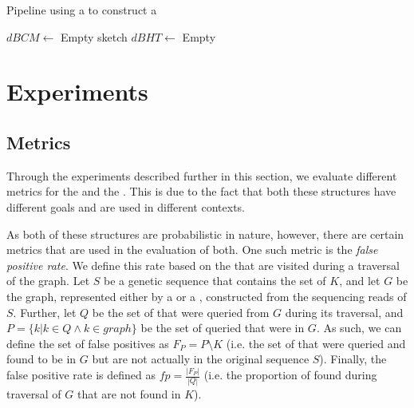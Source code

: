 \begin{algorithm}
  \caption{Pipeline using a \dBCM to construct a \dBHT}\label{alg:pipeline}
  $\mathit{dBCM} \gets$ Empty \dBCM sketch\;
  $\mathit{dBHT} \gets$ Empty \dBHT\;
\end{algorithm}

\section{Experiments}

\subsection{Metrics}

Through the experiments described further in this section, we evaluate different metrics for the \dBCM and the \dBHT. This is due to
the fact that both these structures have different goals and are used in different contexts.

As both of these structures are probabilistic in nature, however, there are certain metrics that are used in the evaluation of both.
One such metric is the \emph{false positive rate}. We define this rate based on the \kmers that are visited during a 
traversal of the graph. Let $S$ be a genetic sequence that contains the set of \kmers $K$, and let $G$ be the graph, represented
either by a \dBCM or a \dBHT, constructed from the sequencing reads of $S$. Further, let $Q$ be the set of \kmers that were queried
from $G$ during its traversal, and $P=\{k | k \in Q \wedge k \in graph\}$ be the set of queried \kmers that were in $G$. As such, we can
define the set of false positives as $F_P=P \setminus K$ (i.e. the set of \kmers that were queried and found to be in $G$ but are not
actually in the original sequence $S$). Finally, the false positive rate is defined as $\mathit{fp}=\frac{|F_P|}{|Q|}$ (i.e. the
proportion of \kmers found during traversal of $G$ that are not found in $K$).

